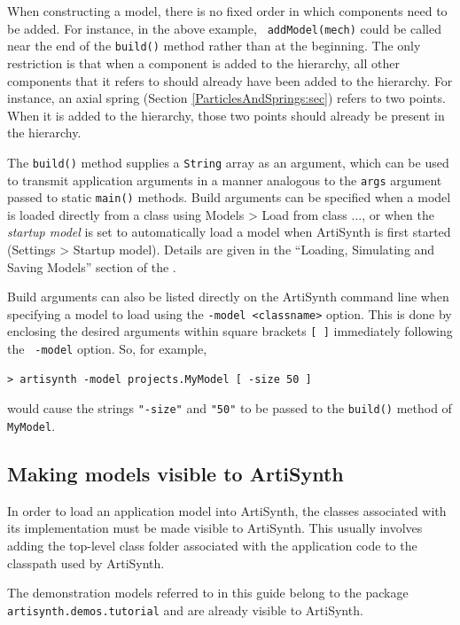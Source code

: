 When constructing a model, there is no fixed order in which components
need to be added. For instance, in the above example, {\tt
addModel(mech)} could be called near the end of the {\tt build()}
method rather than at the beginning. The only restriction is that when
a component is added to the hierarchy, all other components that it
refers to should already have been added to the hierarchy. For
instance, an axial spring (Section \ref{ParticlesAndSprings:sec})
refers to two points. When it is added to the hierarchy, those two
points should already be present in the hierarchy.

The {\tt build()} method supplies a {\tt String} array as an argument,
which can be used to transmit application arguments in a manner
analogous to the {\tt args} argument passed to static {\tt main()}
methods. Build arguments can be specified when a model is loaded
directly from a class using {\sf Models > Load from class ...}, or when
the {\it startup model} is set to automatically load a model
when ArtiSynth is first started ({\sf Settings > Startup
model}). Details are given in the ``Loading, Simulating and
Saving Models'' section of the
.

Build arguments can also be listed directly on the ArtiSynth command
line when specifying a model to load using the {\tt -model
<classname>} option.  This is done by enclosing the desired arguments
within square brackets {\tt [ ]} immediately following the {\tt
-model} option. So, for example,
%
\begin{verbatim}
> artisynth -model projects.MyModel [ -size 50 ]
\end{verbatim}
%
would cause the strings {\tt "-size"} and {\tt "50"} to
be passed to the {\tt build()} method of {\tt MyModel}.

\subsection{Making models visible to ArtiSynth}

In order to load an application model into ArtiSynth, the classes
associated with its implementation must be made visible to ArtiSynth.
This usually involves adding the top-level class folder associated
with the application code to the classpath used by ArtiSynth.

\begin{sideblock}
The demonstration models referred to in this guide belong to the
package {\tt artisynth.demos.tutorial} and are already visible to
ArtiSynth.
\end{sideblock}

